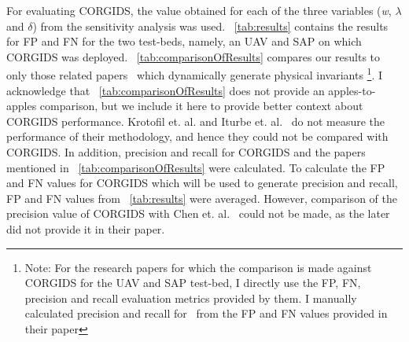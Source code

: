 \begin{table}
\centering
  \caption{Comparison of Precision and Recall for OpenAPS platform}
  \label{tab:comparisonOfResults}
\end{table}

For evaluating \ac{CORGIDS}, the value obtained for each of the three variables (\textit{w}, $\lambda$ and $\delta$) from the sensitivity analysis was used. ~\autoref{tab:results} contains the results for \ac{FP} and \ac{FN} for the two test-beds, namely, an \ac{UAV} and \ac{SAP} on which \ac{CORGIDS} was deployed. ~\autoref{tab:comparisonOfResults} compares our results to only those related papers~\cite{chen2018learning,zohrevand2016hidden,aliabadi2017artinali} which dynamically generate physical invariants \footnote{Note: For the research papers for which the comparison is made against \ac{CORGIDS} for the \ac{UAV} and \ac{SAP} test-bed, I directly use the \ac{FP}, \ac{FN}, precision and recall evaluation metrics provided by them. I manually calculated precision and recall for~\cite{aliabadi2017artinali} from the \ac{FP} and \ac{FN} values provided in their paper}. I acknowledge that ~\autoref{tab:comparisonOfResults} does not provide an apples-to-apples comparison, but we include it here to provide better context about \ac{CORGIDS} performance.
Krotofil et. al. and Iturbe et. al.~\cite{krotofil2015process,iturbe2017feasibility} do not measure the performance of their methodology, and hence they could not be compared with \ac{CORGIDS}. In addition, precision and recall for \ac{CORGIDS} and the papers mentioned in ~\autoref{tab:comparisonOfResults} were calculated. To calculate the \ac{FP} and \ac{FN} values for \ac{CORGIDS} which will be used to generate precision and recall, \ac{FP} and \ac{FN} values from ~\autoref{tab:results} were averaged. However, comparison of the precision value of \ac{CORGIDS} with Chen et. al.~\cite{chen2018learning} could not be made, as the later did not provide it in their paper.  

